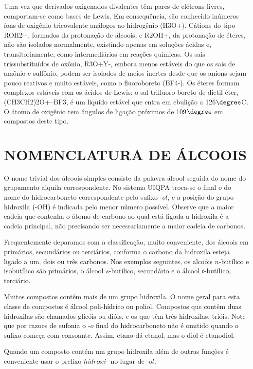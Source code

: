 Uma vez que derivados oxigenados divalentes têm pares de elétrons livres, comportam-se como bases de Lewis. Em consequência, são conhecido inúmeros íons de oxigênio tricovalente análogos ao hidrogênio (H3O+). Cátions do tipo ROH2+, formados da protonação de álcoois, e R2OH+, da protonação de éteres, não são isolados normalmente, existindo apenas em soluções ácidas e, transitoriamente, como intermediários em reações químicas. Os sais trissubstituídos de oxônio, R3O+Y-, embora menos estáveis do que os sais de amônio e sulfônio, podem ser isolados de meios inertes desde que os anions sejam pouco reativos e muito estáveis, como o fluoroboreto (BF4-). Os éteres formam complexos estáveis com os ácidos de Lewis: o sal trifluoro-boreto de dietil-éter, (CH3CH2)2O+--BF3, é um liquido estável que entra em ebulição a 126$\degree$C. O átomo de oxigênio tem ângulos de ligação próximos de 109$\degree$ em compostos deste tipo.

\section{NOMENCLATURA DE ÁLCOOIS}

O nome trivial dos álcoois simples consiste da palavra álcool seguida do nome do grupamento alquila correspondente. No sistema UIQPA troca-se o final $o$ do nome do hidrocarboneto correspondente pelo sufixo -$ol$, e a posição do grupo hidroxila (-OH) é indicada pelo menor número possível. Observe que a maior cadeia que contenha o átomo de carbono ao qual está ligada a hidroxila é a cadeia principal, não precisando ser necessariamente a maior cadeia de carbonos.

Frequentemente deparamos com a classificação, muito conveniente, dos álcoois em primários, secundários ou terciários, conforma o carbono da hidroxila esteja ligado a um, dois ou três carbonos. Nos exemplos seguintes, os alcoóis $n$-butílico e isobutílico são primários, o álcool $s$-butílico, secundário e o álcool $t$-butílico, terciário.

Muitos compostos contêm mais de um grupo hidroxila. O nome geral para esta classe de compostos é álcool poli-hídrico ou poliol. Compostos que contêm duas hidroxilas são chamados glicóis ou dióis, e os que têm três hidroxilas, trióis. Note que por razoes de eufonia o -$o$ final do hidrocarboneto não é omitido quando o sufixo começa com consoante. Assim, etano dá etanol, mas o diol é etanodiol.

Quando um composto contém um grupo hidroxila além de outras funções é conveniente usar o prefixo $hidroxi$- no lugar de -$ol$.

